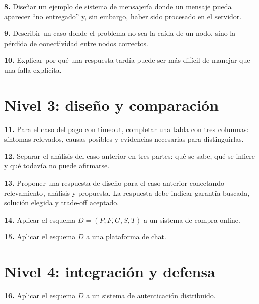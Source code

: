 \documentclass[variant=guia,cover=institutional,mode=screen]{ua-engineering-v6-article}
\begin{document}
\begin{uaexercise}
\textbf{8.}
Diseñar un ejemplo de sistema de mensajería donde un mensaje pueda aparecer “no entregado” y, sin embargo, haber sido procesado en el servidor.
\end{uaexercise}

\begin{uaexercise}
\textbf{9.}
Describir un caso donde el problema no sea la caída de un nodo, sino la pérdida de conectividad entre nodos correctos.
\end{uaexercise}

\begin{uaexercise}
\textbf{10.}
Explicar por qué una respuesta tardía puede ser más difícil de manejar que una falla explícita.
\end{uaexercise}


\section{Nivel 3: diseño y comparación}
\begin{uaexercise}
\textbf{11.}
Para el caso del pago con timeout, completar una tabla con tres columnas: síntomas relevados, causas posibles y evidencias necesarias para distinguirlas.
\end{uaexercise}

\begin{uaexercise}
\textbf{12.}
Separar el análisis del caso anterior en tres partes: qué se sabe, qué se infiere y qué todavía no puede afirmarse.
\end{uaexercise}

\begin{uaexercise}
\textbf{13.}
Proponer una respuesta de diseño para el caso anterior conectando relevamiento, análisis y propuesta.
La respuesta debe indicar garantía buscada, solución elegida y trade-off aceptado.
\end{uaexercise}

\begin{uaexercise}
\textbf{14.}
Aplicar el esquema $D=(P,F,G,S,T)$ a un sistema de compra online.
\end{uaexercise}

\begin{uaexercise}
\textbf{15.}
Aplicar el esquema $D$ a una plataforma de chat.
\end{uaexercise}


\section{Nivel 4: integración y defensa}
\begin{uaexercise}
\textbf{16.}
Aplicar el esquema $D$ a un sistema de autenticación distribuido.
\end{uaexercise}
\end{document}
